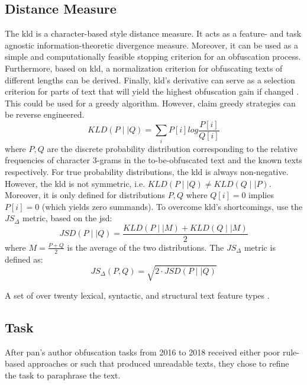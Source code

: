 \subsection{Distance Measure}
The \ac{kld} is a character-based style distance measure.
It acts as a feature- and task agnostic %
information-theoretic divergence measure.
Moreover, it can be used as a simple and computationally feasible stopping criterion for an obfuscation process.
Furthermore, based on \ac{kld}, a normalization criterion for obfuscating texts of different lengths can be derived.
Finally, \ac{kld}'s derivative can serve as a selection criterion for parts of text that 
will yield the highest obfuscation gain if changed \cite{bevendorff_divergence_based_2020}.
This could be used for a greedy algorithm.
However, \citet{bevendorff_divergence_based_2020} claim greedy strategies can be reverse engineered.
$$KLD(P\mid \mid Q) = \sum_{i}^{}P[i] log\frac{P[i]}{Q[i]}$$
where $P,Q$ are the discrete probability distribution corresponding to the relative frequencies of character 3-grams in the 
to-be-obfuscated text and the known texts respectively.
For true probability distributions, the \ac{kld} is always non-negative.
However, the \ac{kld} is not symmetric, i.e. $KLD(P\mid \mid Q) \neq KLD(Q\mid \mid P)$.
Moreover, it is only defined for distributions $P,Q$ where $Q[i] = 0$ implies $P[i] = 0$ (which yields zero summands).
To overcome \ac{kld}'s shortcomings, 
\citet{bevendorff_divergence_based_2020} use the $JS_\Delta$ metric, based on the \ac{jsd}:
$$JSD(P\mid \mid Q) = \frac{KLD(P\mid \mid M)+KLD(Q\mid \mid M)}{2}$$
where $M = \frac{P + Q}{2}$ is the average of the two distributions.
The $JS_\Delta$ metric is defined as:
$$JS_\Delta(P,Q) = \sqrt{2\cdot JSD(P\mid \mid Q)}$$

\begin{definition}
    [Writeprints]
    \label{def:writeprints}
    A set of over twenty lexical, syntactic, and structural text feature types \cite{bevendorff_divergence_based_2020}.
\end{definition}

\subsection{Task}
After \ac{pan}'s author obfuscation tasks from 2016 to 2018 received either poor rule-based approaches or such that 
produced unreadable texts, they chose to refine the task to paraphrase the text.

